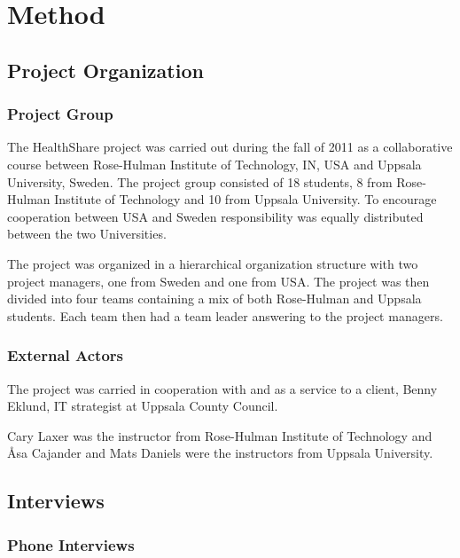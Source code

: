\documentclass[14pt]{article}
\begin{document}
\newpage

\section{Method}
\label{sec:Method}

\subsection{Project Organization}
\subsubsection{Project Group}
The HealthShare project was carried out during the fall of 2011 as a collaborative course between Rose-Hulman Institute of Technology, IN, USA and Uppsala University, Sweden.
The project group consisted of 18 students, 8 from Rose-Hulman Institute of Technology and 10 from Uppsala University. To encourage cooperation between USA and Sweden responsibility was equally distributed between the two Universities.

The project was organized in a hierarchical organization structure with two project managers, one from Sweden and one from USA. The project was then divided into four teams containing a mix of both Rose-Hulman and Uppsala students. Each team then had a team leader answering to the project managers.

\subsubsection{External Actors}
The project was carried in cooperation with and as a service to a client, Benny Eklund, IT strategist at Uppsala County Council.

Cary Laxer was the instructor from Rose-Hulman Institute of Technology and Åsa Cajander and Mats Daniels were the instructors from Uppsala University.

\subsection{Interviews}

\subsubsection{Phone Interviews}
\end{document}
